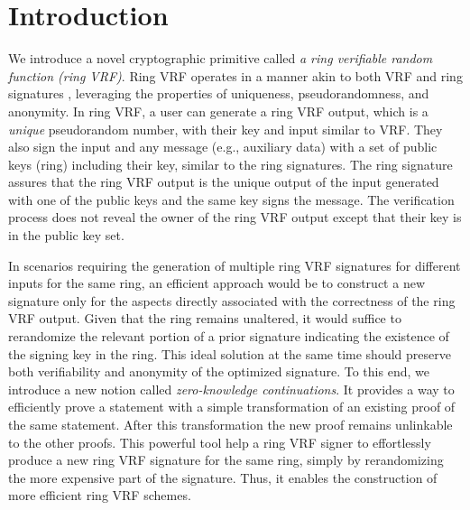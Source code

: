 \section{Introduction}

We introduce a novel cryptographic primitive called \emph{a ring verifiable random function (ring VRF)}. Ring VRF  operates in a manner akin to both VRF \cite{vrf_micali}  and ring signatures \cite{ring_accountable,ring_efficient,ring_linkable,ring_noRO,ring_sublinear}, leveraging the properties of uniqueness, pseudorandomness, and anonymity. In ring VRF, a user can generate a ring VRF output, which is a \emph{unique} pseudorandom number, with their key and  input  similar to VRF. They also sign the input and any message (e.g., auxiliary data) with a set of public keys  (ring) including their key, similar to the ring signatures. The ring signature assures that the ring VRF output is the unique output of the input generated with one of the public keys and the same key signs the message. The verification process does not reveal the owner of the  ring VRF output except that their key is in the public key set.


In scenarios requiring the generation of multiple ring VRF signatures for different inputs for the same ring, an efficient approach would be to construct a new signature only for the aspects directly associated with the correctness of the ring VRF output. Given that the ring remains unaltered, it would suffice to rerandomize the relevant portion of a prior signature indicating the existence of the signing key in the ring. This ideal solution  at the same time should preserve both verifiability and anonymity of the optimized signature.
To this end, we introduce a  new notion called \emph{zero-knowledge continuations}. It provides a way to efficiently prove a statement with a simple transformation of an existing proof of the same statement. After this transformation the new proof remains unlinkable to the other proofs. This powerful tool help a ring VRF signer to effortlessly produce a new ring VRF signature for the same ring, simply by rerandomizing the more expensive part of the signature. Thus, it enables the construction of more efficient ring VRF schemes.

